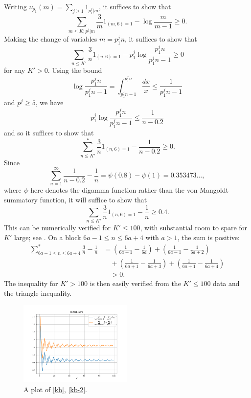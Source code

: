\documentclass[12pt,a4paper,reqno]{amsart}
\numberwithin{equation}{section}
\theoremstyle{plain}
\theoremstyle{definition}
\begin{document}
Writing $\nu_{p_1}(m) = \sum_{j \geq 1} 1_{p_1^j|m}$, it suffices to show that
  $$ \sum_{m \leq K; p^j|m} \frac{3}{m} 1_{(m,6)=1} - \log \frac{m}{m-1} \geq 0.$$
Making the change of variables $m = p_1^j n$, it suffices to show that
  $$ \sum_{n \leq K'} \frac{3}{n} 1_{(n,6)=1} - p_1^j \log \frac{p_1^j n}{p_1^j n - 1} \geq 0$$
  for any $K' > 0$.   Using the bound
  $$ \log \frac{p_1^jn}{p_1^jn - 1} = \int_{p_1^jn-1}^{p_1^jn} \frac{dx}{x} \leq \frac{1}{p_1^jn-1}$$
  and $p^j \geq 5$, we have
  $$ p_1^j \log \frac{p_1^j n}{p_1^j n - 1} \leq \frac{1}{n-0.2}$$
  and so it suffices to show that
  \begin{equation}\label{kb}
  \sum_{n \leq K'}^* \frac{3}{n} 1_{(n,6)=1} - \frac{1}{n-0.2} \geq 0.
  \end{equation}
  Since 
  $$ \sum_{n=1}^\infty \frac{1}{n-0.2}-\frac{1}{n} = \psi(0.8)-\psi(1) = 0.353473\dots,$$
  where $\psi$ here denotes the digamma function rather than the von Mangoldt summatory function, it will suffice to show that
  \begin{equation}\label{kb-2}
  \sum_{n \leq K'} \frac{3}{n} 1_{(n,6)=1} - \frac{1}{n} \geq 0.4.\end{equation}
  This can be numerically verified for $K' \leq 100$, with substantial room to spare for $K'$ large; see . On a block $6a-1 \leq n \leq 6a+4$ with $a>1$, the sum is positive:
  \begin{align*}
  \sum_{6a-1 \leq n \leq 6a+4}^* \frac{3}{n}  - \frac{1}{n } &= \left(\frac{1}{6a-1} - \frac{1}{6a}\right) + \left(\frac{1}{6a-1} - \frac{1}{6a+2}\right)\\
  &\quad + \left(\frac{1}{6a+1} - \frac{1}{6a+3}\right) + \left(\frac{1}{6a+1} - \frac{1}{6a+4}\right) \\
  &\quad > 0.
  \end{align*}
The inequality for $K'>100$ is then easily verified from the $K' \leq 100$ data and the triangle inequality.
  
  \begin{figure}
  \centering
  \includegraphics[width=0.5\textwidth]{key_ineq.png}
  \caption{A plot of \eqref{kb}, \eqref{kb-2}.}
  \label{fig:kb}
  \end{figure}
\end{document}
